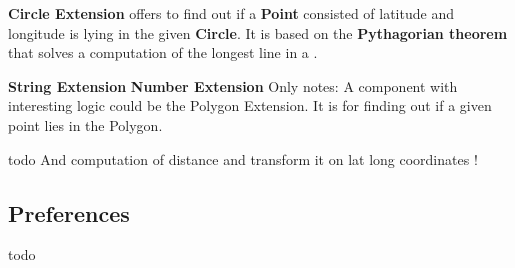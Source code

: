 \textbf{Circle Extension} offers to find out if a \textbf{Point}\cite{} consisted of latitude and longitude is lying in the given \textbf{Circle}\cite{}.
It is based on the \textbf{Pythagorian theorem} that solves a computation of the longest line in a .

\textbf{String Extension}
\textbf{Number Extension}
Only notes:
A component with interesting logic could be the Polygon Extension.
It is for finding out if a given point lies in the Polygon.

todo
And computation of distance and transform it on lat long coordinates !

\subsection{Preferences}\label{subsec:preferences}
todo
